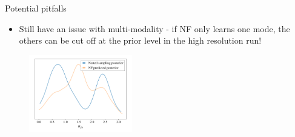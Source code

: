 \documentclass[aspectratio=169]{beamer}
\begin{document}
\begin{frame}{Potential pitfalls}\vfill
    \begin{itemize}
        \item Still have an issue with multi-modality - if NF only learns one mode, the others can be cut off at the prior level in the high resolution run!
    \end{itemize}
    \begin{figure}
        \centering
        \includegraphics[width=0.4\textwidth]{Ca_Foscari Beamer/presentation_multimodality.pdf}
    \end{figure}\vspace{0em}
\end{frame}
\end{document}
